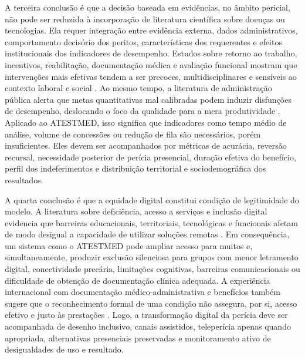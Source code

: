 \documentclass[12pt,a4paper]{article}
\begin{document}
A terceira conclusão é que a decisão baseada em evidências, no âmbito pericial, não pode ser reduzida à incorporação de literatura científica sobre doenças ou tecnologias. Ela requer integração entre evidência externa, dados administrativos, comportamento decisório dos peritos, características dos requerentes e efeitos institucionais dos indicadores de desempenho. Estudos sobre retorno ao trabalho, incentivos, reabilitação, documentação médica e avaliação funcional mostram que intervenções mais efetivas tendem a ser precoces, multidisciplinares e sensíveis ao contexto laboral e social \parencite{gabbay2011niceguidanceonlongtermsicknessandincapacity, przysada2019anassessmentofworkabilityafterthecompletionofre, corden2001incapacitybenefitsandworkincentives, sainsbury2006routesontoincapacitybenefitsfindingsfromqualitati}. Ao mesmo tempo, a literatura de administração pública alerta que metas quantitativas mal calibradas podem induzir disfunções de desempenho, deslocando o foco da qualidade para a mera produtividade \parencite{kelman2009performanceimprovementandperformancedysfunctionanemp}. Aplicado ao ATESTMED, isso significa que indicadores como tempo médio de análise, volume de concessões ou redução de fila são necessários, porém insuficientes. Eles devem ser acompanhados por métricas de acurácia, reversão recursal, necessidade posterior de perícia presencial, duração efetiva do benefício, perfil dos indeferimentos e distribuição territorial e sociodemográfica dos resultados.

A quarta conclusão é que a equidade digital constitui condição de legitimidade do modelo. A literatura sobre deficiência, acesso a serviços e inclusão digital evidencia que barreiras educacionais, territoriais, tecnológicas e funcionais afetam de modo desigual a capacidade de utilizar soluções remotas \parencite{albasheer2026telemedicineutilizationanddigitalinclusionamongpe, m2024astudyofdisabilityseveritybarriersandfacilitatingfactor, gao2019disabilityconcentrationandaccesstorehabilitationservice, mackett2025ametareviewofliteraturereviewsofdisabilitytravel}. Em consequência, um sistema como o ATESTMED pode ampliar acesso para muitos e, simultaneamente, produzir exclusão silenciosa para grupos com menor letramento digital, conectividade precária, limitações cognitivas, barreiras comunicacionais ou dificuldade de obtenção de documentação clínica adequada. A experiência internacional com documentação médico-administrativa e benefícios também sugere que o reconhecimento formal de uma condição não assegura, por si, acesso efetivo e justo às prestações \parencite{rajasulochana2026doeshavingadisabilitycertificateensurebenefit, sa2020medicalcertificateofdisabilityadescriptiveanalysisofav, nogueira20200731t0100000100aavaliacaodadeficiencianatraje}. Logo, a transformação digital da perícia deve ser acompanhada de desenho inclusivo, canais assistidos, teleperícia apenas quando apropriada, alternativas presenciais preservadas e monitoramento ativo de desigualdades de uso e resultado.
\end{document}
